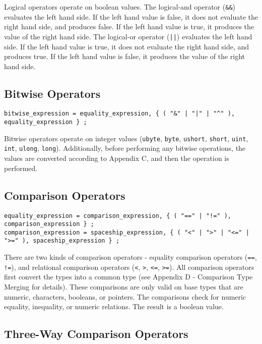 \documentclass[letterpaper,12pt]{book}
\begin{document}
Logical operators operate on boolean values. The logical-and operator (\texttt{\&\&}) evaluates the left hand side. If the left hand value is false, it does not evaluate the right hand side, and produces false. If the left hand value is true, it produces the value of the right hand side. The logical-or operator (\texttt{||}) evaluates the left hand side. If the left hand value is true, it does not evaluate the right hand side, and produces true. If the left hand value is false, it produces the value of the right hand side.

\subsection{Bitwise Operators}

\begin{lstlisting}[breaklines=true]
bitwise_expression = equality_expression, { ( "&" | "|" | "^" ), equality_expression } ;
\end{lstlisting}

Bitwise operators operate on integer values (\texttt{ubyte}, \texttt{byte}, \texttt{ushort}, \texttt{short}, \texttt{uint}, \texttt{int}, \texttt{ulong}, \texttt{long}). Additionally, before performing any bitwise operations, the values are converted according to Appendix C, and then the operation is performed.

\subsection{Comparison Operators}

\begin{lstlisting}[breaklines=true]
equality_expression = comparison_expression, { ( "==" | "!=" ), comparison_expression } ;
comparison_expression = spaceship_expression, { ( "<" | ">" | "<=" | ">=" ), spaceship_expression } ;
\end{lstlisting}

There are two kinds of comparison operators - equality comparison operators (\texttt{==}, \texttt{!=}), and relational comparison operators (\texttt{<}, \texttt{>}, \texttt{<=}, \texttt{>=}). All comparison operators first convert the types into a common type (see Appendix D - Comparison Type Merging for details). These comparisons are only valid on base types that are numeric, characters, booleans, or pointers. The comparisons check for numeric equality, inequality, or numeric relations. The result is a boolean value.

\subsection{Three-Way Comparison Operators}
\end{document}
